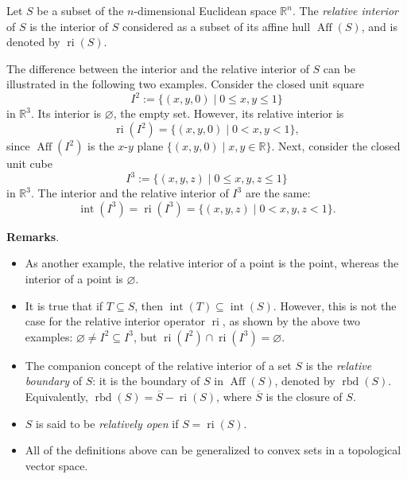 \documentclass[12pt]{article}
\begin{document}
Let $S$ be a subset of the $n$-dimensional Euclidean space $\mathbb{R}^n$.  The \emph{relative interior} of $S$ is the interior of $S$ considered as a subset of its affine hull $\operatorname{Aff}(S)$, and is denoted by $\operatorname{ri}(S)$.

The difference between the interior and the relative interior of $S$ can be illustrated in the following two examples.  Consider the closed unit square $$I^2:=\lbrace (x,y,0)\mid 0\le x, y\le 1\rbrace$$ in $\mathbb{R}^3$.  Its interior is $\varnothing$, the empty set.  However, its relative interior is $$\operatorname{ri}(I^2)=\lbrace (x,y,0)\mid 0< x,y< 1\rbrace,$$ since $\operatorname{Aff}(I^2)$ is the $x$-$y$ plane $\lbrace (x,y,0)\mid x,y\in\mathbb{R}\rbrace$. Next, consider the closed unit cube $$I^3:=\lbrace (x,y,z)\mid 0\le x, y, z\le 1\rbrace$$ in $\mathbb{R}^3$.  The interior and the relative interior of $I^3$ are the same: $$\operatorname{int}(I^3)=\operatorname{ri}(I^3)=\lbrace (x,y,z)\mid 0< x,y,z< 1\rbrace.$$

\textbf{Remarks}.  
\begin{itemize}
\item As another example, the relative interior of a point is the point, whereas the interior of a point is $\varnothing$.
\item It is true that if $T\subseteq S$, then $\operatorname{int}(T)\subseteq \operatorname{int}(S)$.  However, this is not the case for the relative interior operator $\operatorname{ri}$, as shown by the above two examples: $\varnothing\neq I^2\subseteq I^3$, but $\operatorname{ri}(I^2)\cap \operatorname{ri}(I^3)=\varnothing$.
\item The companion concept of the relative interior of a set $S$ is the \emph{relative boundary} of $S$: it is the boundary of $S$ in $\operatorname{Aff}(S)$, denoted by $\operatorname{rbd}(S)$.  Equivalently, $\operatorname{rbd}(S)=\overline{S}-\operatorname{ri}(S)$, where $\overline{S}$ is the closure of $S$.
\item $S$ is said to be \emph{relatively open} if $S=\operatorname{ri}(S)$.
\item All of the definitions above can be generalized to convex sets in a topological vector space.
\end{itemize}
\end{document}
